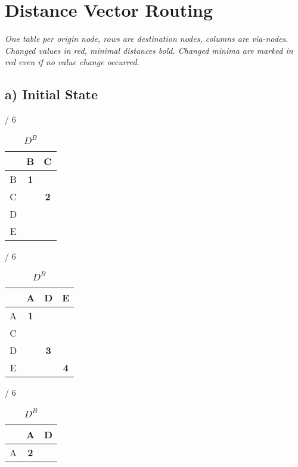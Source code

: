 \documentclass[a4paper, 11 pt, article, accentcolor=tud7b]{tudreport}
\begin{document}
	\newpage
	
	\section{Distance Vector Routing}
	
	\textit{One table per origin node, rows are destination nodes, columns are via-nodes. Changed values in red, minimal distances bold. Changed minima are marked in red even if no value change occurred.}
	
	\subsection*{a) Initial State}
	\begin{table}[h]
	  \begin{subtable}[b]{\textwidth / 6}
	    \begin{tabular}{| c | c | c |}
	      \hline
	        & B          & C          \\ \hline
	      B & \textbf{1} &            \\ \hline
	      C &            & \textbf{2} \\ \hline
	      D &            &            \\ \hline
	      E &            &            \\ \hline
	    \end{tabular}
	    \caption{$D^{A}$}
	  \end{subtable}
	  \hfill
	  \begin{subtable}[b]{\textwidth / 6}
	    \begin{tabular}{| c | c | c | c |}
	    \hline
	      & A          & D & E                   \\ \hline
	    A & \textbf{1} &            &            \\ \hline
	    C &            &            &            \\ \hline
	    D &            & \textbf{3} &            \\ \hline
	    E &            &            & \textbf{4} \\ \hline
	    \end{tabular}
	    \caption{$D^{B}$}
	  \end{subtable}
	  \hfill
	  \begin{subtable}[b]{\textwidth / 6}
	    \begin{tabular}{| c | c | c |}
	    \hline
	      & A          & D          \\ \hline
	    A & \textbf{2} &            \\ \hline

\end{tabular}
\end{subtable}
\end{table}
\end{document}
